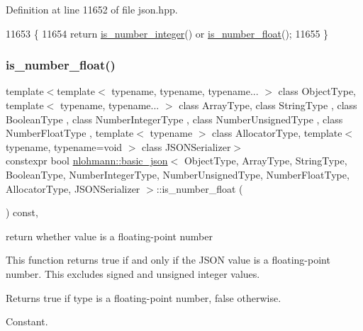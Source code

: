 Definition at line 11652 of file json.\+hpp.


\begin{DoxyCode}
11653     \{
11654         \textcolor{keywordflow}{return} \hyperlink{classnlohmann_1_1basic__json_abac8af76067f1e8fdca9052882c74428}{is\_number\_integer}() or \hyperlink{classnlohmann_1_1basic__json_a33b4bf898b857c962e798fc7f6e86e70}{is\_number\_float}();
11655     \}
\end{DoxyCode}
\mbox{\label{classnlohmann_1_1basic__json_a33b4bf898b857c962e798fc7f6e86e70}} 
\subsubsection{\texorpdfstring{is\+\_\+number\+\_\+float()}{is\_number\_float()}}
{\footnotesize\ttfamily template$<$template$<$ typename, typename, typename... $>$ class Object\+Type, template$<$ typename, typename... $>$ class Array\+Type, class String\+Type , class Boolean\+Type , class Number\+Integer\+Type , class Number\+Unsigned\+Type , class Number\+Float\+Type , template$<$ typename $>$ class Allocator\+Type, template$<$ typename, typename=void $>$ class J\+S\+O\+N\+Serializer$>$ \\
constexpr bool \hyperlink{classnlohmann_1_1basic__json}{nlohmann\+::basic\+\_\+json}$<$ Object\+Type, Array\+Type, String\+Type, Boolean\+Type, Number\+Integer\+Type, Number\+Unsigned\+Type, Number\+Float\+Type, Allocator\+Type, J\+S\+O\+N\+Serializer $>$\+::is\+\_\+number\+\_\+float (\begin{DoxyParamCaption}{ }\end{DoxyParamCaption}) const\hspace{0.3cm}{\ttfamily [inline]}, {\ttfamily [noexcept]}}



return whether value is a floating-\/point number 

This function returns true if and only if the J\+S\+ON value is a floating-\/point number. This excludes signed and unsigned integer values.

\begin{DoxyReturn}{Returns}
{\ttfamily true} if type is a floating-\/point number, {\ttfamily false} otherwise.
\end{DoxyReturn}
Constant.

